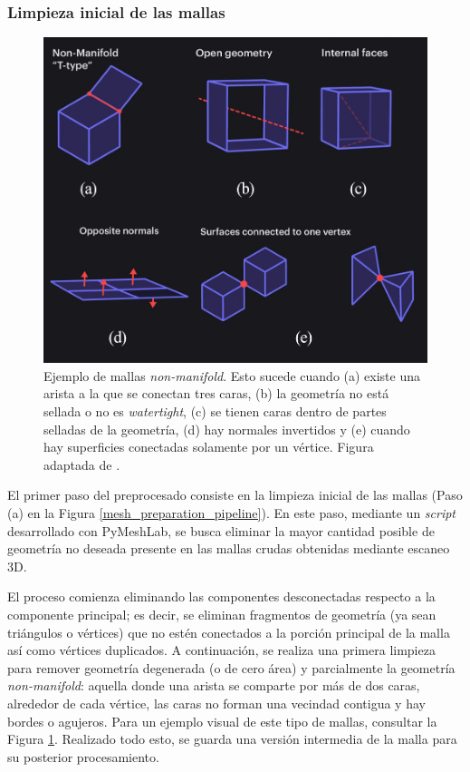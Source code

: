\subsubsection{Limpieza inicial de las mallas}
\begin{figure}[h]
    \includegraphics[width=\linewidth]{figures/4_materials-methods/nonmanifold_examples.png}
    \caption[Ejemplo de mallas \textit{non-manifold}]{Ejemplo de mallas \textit{non-manifold}. Esto sucede cuando (a) existe una arista a la que se conectan tres caras, (b) la geometría no está sellada o no es \textit{watertight}, (c) se tienen caras dentro de partes selladas de la geometría, (d) hay normales invertidos y (e) cuando hay superficies conectadas solamente por un vértice. Figura adaptada de \cite{manifold_types_2021}.}
    \label{non_manifold_types}
\end{figure}

El primer paso del preprocesado consiste en la limpieza inicial de las mallas (Paso (a) en la Figura \ref{mesh_preparation_pipeline}). En este paso, mediante un \textit{script} desarrollado con PyMeshLab, se busca eliminar la mayor cantidad posible de geometría no deseada presente en las mallas crudas obtenidas mediante escaneo 3D.

El proceso comienza eliminando las componentes desconectadas respecto a la componente principal; es decir, se eliminan fragmentos de geometría (ya sean triángulos o vértices) que no estén conectados a la porción principal de la malla así como vértices duplicados. A continuación, se realiza una primera limpieza para remover geometría degenerada (o de cero área) y parcialmente la geometría \textit{non-manifold}: aquella donde una arista se comparte por más de dos caras, alrededor de cada vértice, las caras no forman una vecindad contigua y hay bordes o agujeros. Para un ejemplo visual de este tipo de mallas, consultar la Figura \ref{non_manifold_types}. Realizado todo esto, se guarda una versión intermedia de la malla para su posterior procesamiento.

